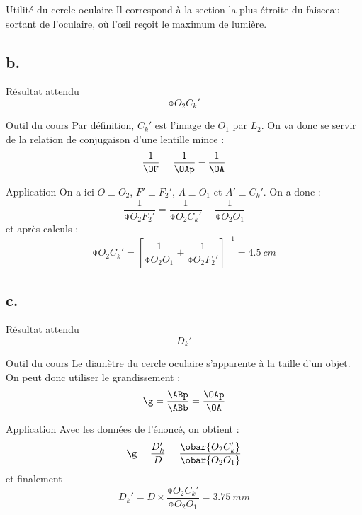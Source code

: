 \documentclass[../main/main.tex]{subfiles}
\begin{document}
\begin{inte}{Utilité du cercle oculaire}
    Il correspond à la section la plus étroite du faisceau sortant de
    l'oculaire, où l'œil reçoit le maximum de lumière.  
\end{inte}

\setcounter{subsection}{2}
\subsection{b.}
\begin{NCprop}{Résultat attendu}
    $$\obar{O_2C_k'}$$
\end{NCprop}

\begin{NCdemo}{Outil du cours}
    Par définition, $C_k'$ est l'image de $O_1$ par $L_2$. On va donc se servir
    de la relation de conjugaison d'une lentille mince :
    \[ \frac{1}{\OF} = \frac{1}{\OAp} - \frac{1}{\OA} \]
\end{NCdemo}

\begin{NCexem}{Application}
    On a ici $O \equiv O_2$, $F' \equiv F_2'$, $A \equiv O_1$ et $A' \equiv
    C_k'$. On a donc :
    \[ \frac{1}{\obar{O_2F_2'}} = \frac{1}{\obar{O_2C_k'}} -
    \frac{1}{\obar{O_2O_1}} \]
    et après calculs :
    \[ \boxed{\obar{O_2C_k'} = \left[ \frac{1}{\obar{O_2O_1}} +
    \frac{1}{\obar{O_2F_2'}}\right]^{-1} = \SI{+4.5}{cm}} \]
\end{NCexem}

\setcounter{subsection}{2}
\subsection{c.}
\begin{NCprop}{Résultat attendu}
    $$D_k'$$
\end{NCprop}

\begin{NCdemo}{Outil du cours}
    Le diamètre du cercle oculaire s'apparente à la taille d'un objet. On peut
    donc utiliser le grandissement :
    \[ \g = \frac{\ABp}{\ABb} = \frac{\OAp}{\OA} \]
\end{NCdemo}

\begin{NCexem}{Application}
    Avec les données de l'énoncé, on obtient :
    \[ \g = \frac{D_k'}{D} = \frac{\obar{O_2C_k'}}{\obar{O_2O_1}}\]
    et finalement
    \[ \boxed{D_k' = D\times \frac{\obar{O_2C_k'}}{\obar{O_2O_1}} =
    \SI{3.75}{mm}} \]
\end{NCexem}
\end{document}
